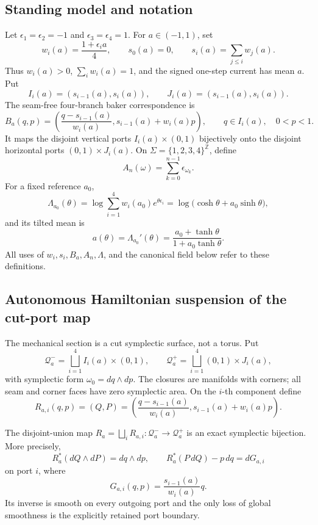 \subsection{Standing model and notation}

Let \(\epsilon_1=\epsilon_2=-1\) and
\(\epsilon_3=\epsilon_4=1\).  For \(a\in(-1,1)\), set
\[
 w_i(a)=\frac{1+\epsilon_i a}{4},\qquad
 s_0(a)=0,\qquad s_i(a)=\sum_{j\le i}w_j(a).
\]
Thus \(w_i(a)>0\), \(\sum_iw_i(a)=1\), and the signed one-step
current has mean \(a\).  Put
\[
 I_i(a)=(s_{i-1}(a),s_i(a)),\qquad
 J_i(a)=(s_{i-1}(a),s_i(a)).
\]
The seam-free four-branch baker correspondence is
\[
 B_a(q,p)=\left(
 \frac{q-s_{i-1}(a)}{w_i(a)},
 s_{i-1}(a)+w_i(a)p
 \right),\qquad q\in I_i(a),\quad 0<p<1.
\]
It maps the disjoint vertical ports \(I_i(a)\times(0,1)\) bijectively onto
the disjoint horizontal ports \((0,1)\times J_i(a)\).  On
\(\Sigma=\{1,2,3,4\}^{\mathbb Z}\), define
\[
 A_n(\omega)=\sum_{k=0}^{n-1}\epsilon_{\omega_k}.
\]
For a fixed reference \(a_0\),
\[
 \Lambda_{a_0}(\theta)
 =\log\sum_{i=1}^4w_i(a_0)e^{\theta\epsilon_i}
 =\log\big(\cosh\theta+a_0\sinh\theta\big),
\]
and its tilted mean is
\[
 a(\theta)=\Lambda_{a_0}'(\theta)
 =\frac{a_0+\tanh\theta}{1+a_0\tanh\theta}.
\]
All uses of \(w_i,s_i,B_a,A_n,\Lambda\), and the canonical field below refer
to these definitions.

\subsection{Autonomous Hamiltonian suspension of the cut-port map}

The mechanical section is a cut symplectic surface, not a torus.  Put
\[
 \mathcal Q_a^-
 =\bigsqcup_{i=1}^4 I_i(a)\times(0,1),
 \qquad
 \mathcal Q_a^+
 =\bigsqcup_{i=1}^4(0,1)\times J_i(a),
\]
with symplectic form \(\omega_0=dq\wedge dp\).  The closures are manifolds
with corners; all seam and corner faces have zero symplectic area.  On the
\(i\)-th component define
\[
 R_{a,i}(q,p)=
 \left(Q,P\right)
 =\left(
 \frac{q-s_{i-1}(a)}{w_i(a)},
 s_{i-1}(a)+w_i(a)p
 \right).
\]

\begin{lemma}
\label{lem:r4-a1-exact-port}
The disjoint-union map
\(R_a=\bigsqcup_iR_{a,i}:\mathcal Q_a^-\to\mathcal Q_a^+\) is an exact
symplectic bijection.  More precisely,
\[
 R_a^*(dQ\wedge dP)=dq\wedge dp,
\qquad
 R_a^*(P\,dQ)-p\,dq=dG_{a,i}
\]
on port \(i\), where
\[
 G_{a,i}(q,p)=\frac{s_{i-1}(a)}{w_i(a)}q.
\]
Its inverse is smooth on every outgoing port and the only loss of global
smoothness is the explicitly retained port boundary.
\end{lemma}

